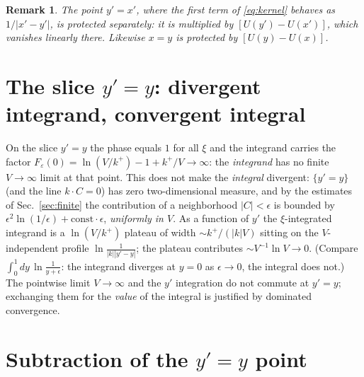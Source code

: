 \documentclass[11pt]{article}
\newtheorem{remark}{Remark}
\newcommand{\bC}{C}
\begin{document}
\begin{remark}
The point $y'=x'$, where the first term of \eqref{eq:kernel} behaves as
$1/|x'-y'|$, is protected separately: it is multiplied by
$[U(y')-U(x')]$, which vanishes linearly there.  Likewise $x=y$ is
protected by $[U(y)-U(x)]$.
\end{remark}

\section{The slice $y'=y$: divergent integrand, convergent integral}
\label{sec:slice}

On the slice $y'=y$ the phase equals $1$ for all $\xi$ and the integrand
carries the factor $F_\varepsilon(0)=\ln(V/k^+)-1+k^+/V\to\infty$: the
\emph{integrand} has no finite $V\to\infty$ limit at that point.  This
does not make the \emph{integral} divergent: $\{y'=y\}$ (and the line
$k\cdot\bC=0$) has zero two-dimensional measure, and by the estimates of
Sec.~\ref{sec:finite} the contribution of a neighborhood $|\bC|<\epsilon$
is bounded by $\epsilon^{2}\ln(1/\epsilon)+\mathrm{const}\cdot\epsilon$,
\emph{uniformly in $V$}.  As a function of $y'$ the $\xi$-integrated
integrand is a $\ln(V/k^+)$ plateau of width $\sim k^+/(|k|V)$ sitting
on the $V$-independent profile $\ln\frac{1}{|k||y'-y|}$; the plateau
contributes $\sim V^{-1}\ln V\to0$.  (Compare
$\int_0^1dy\,\ln\frac{1}{y+\epsilon}$: the integrand diverges at $y=0$
as $\epsilon\to0$, the integral does not.)  The pointwise limit
$V\to\infty$ and the $y'$ integration do not commute at $y'=y$;
exchanging them for the \emph{value} of the integral is justified by
dominated convergence.

\section{Subtraction of the $y'=y$ point}
\label{sec:subtraction}
\end{document}
